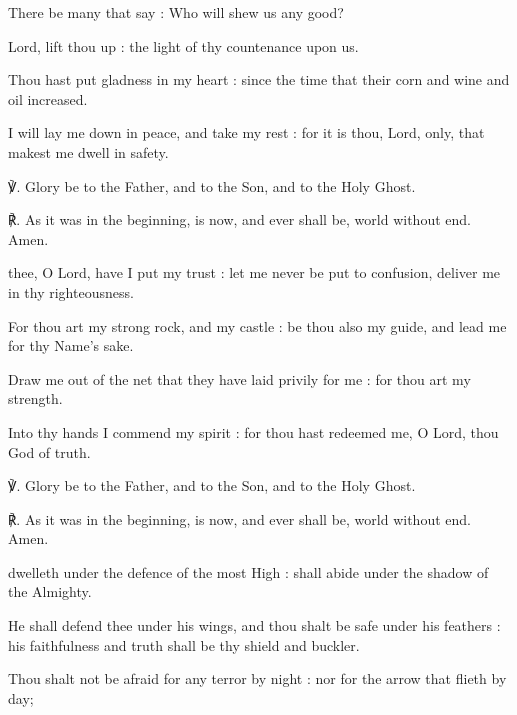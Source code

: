 There be many that say : Who will shew us any good?\par
{}Lord, lift thou up : the light of thy countenance upon us.\par
{}Thou hast put gladness in my heart : since the time that their corn and wine and oil increased.\par
{}I will lay me down in peace, and take my rest : for it is thou, Lord, only, that makest me dwell in safety.\par
℣. Glory be to the Father, and to the Son, and to the Holy Ghost.\par
℟. As it was in the beginning, is now, and ever shall be, world without end. Amen.
\par
{}
 thee, O Lord, have I put my trust : let me never be put to confusion, deliver me in thy righteousness.\par
{}
For thou art my strong rock, and my castle : be thou also my guide, and lead me for thy Name's sake.\par
{}Draw me out of the net that they have laid privily for me : for thou art my strength.\par
{}Into thy hands I commend my spirit : for thou hast redeemed me, O Lord, thou God of truth.\par
℣. Glory be to the Father, and to the Son, and to the Holy Ghost.\par
℟. As it was in the beginning, is now, and ever shall be, world without end. Amen.
\par
{}
 dwelleth under the defence of the most High : shall abide under the shadow of the Almighty.\par
{}
He shall defend thee under his wings, and thou shalt be safe under his feathers : his faithfulness and truth shall be thy shield and buckler.\par
{}Thou shalt not be afraid for any terror by night : nor for the arrow that flieth by day;\par
